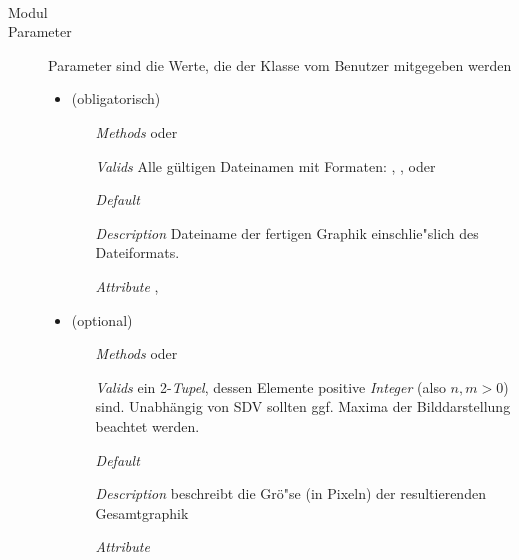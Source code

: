 
\paragraph{}

\begin{description}
\item[Modul] 

  
\item[Parameter] Parameter sind die Werte, die der Klasse vom Benutzer
  mitgegeben werden

\begin{itemize}
\item {} (obligatorisch)
\begin{enumerate}
\item[\textit{Methods}]   oder 
\item[\textit{Valids}] Alle g\"ultigen Dateinamen mit Formaten:
  , ,  oder
\item[\textit{Default}] 
\item[\textit{Description}] Dateiname der fertigen Graphik
  einschlie"slich des Dateiformats.
\item[\textit{Attribute}] ,
\end{enumerate}

\item {} (optional)
\begin{enumerate}
\item[\textit{Methods}] 
  oder 
\item[\textit{Valids}] ein 2-\textit{Tupel}, dessen Elemente positive
  \textit{Integer} (also $n, m > 0$) sind. Unabh\"angig von SDV
  sollten ggf. Maxima der Bilddarstellung beachtet werden.
\item[\textit{Default}] 
\item[\textit{Description}] beschreibt die Gr\"o"se (in Pixeln) der
  resultierenden Gesamtgraphik
\item[\textit{Attribute}] 
\end{enumerate}


\end{itemize}
\end{description}
